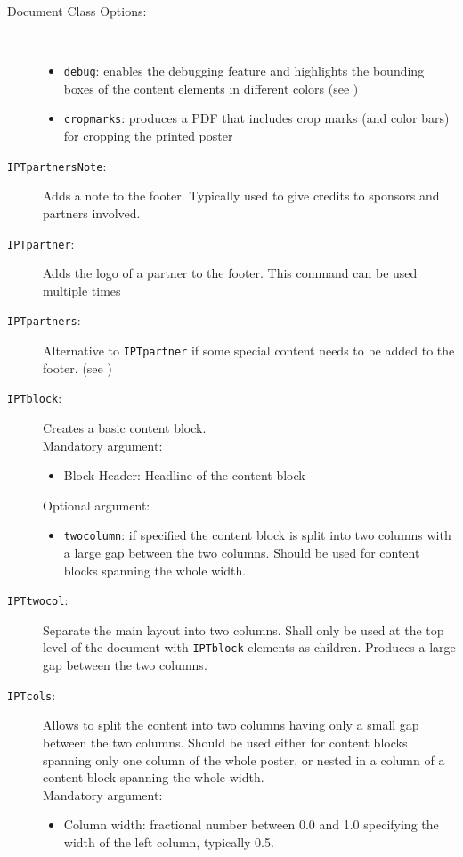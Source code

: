 \begin{description}
	\item[Document Class Options:]~
		\begin{itemize}
			\item \texttt{debug}: enables the debugging feature and highlights the bounding boxes of the content elements in different colors (see )
			\item \texttt{cropmarks}: produces a PDF that includes crop marks (and color bars) for cropping the printed poster
		\end{itemize}
	\item[\texttt{IPTpartnersNote}:]
		Adds a note to the footer. Typically used to give credits to sponsors and partners involved.
	\item[\texttt{IPTpartner}:]
		Adds the logo of a partner to the footer. This command can be used multiple times
	\item[\texttt{IPTpartners}:]
		Alternative to \texttt{\bs{}IPTpartner} if some special content needs to be added to the footer. (see )
	\item[\texttt{IPTblock}:] Creates a basic content block. \\
		Mandatory argument: 
		\begin{itemize}
			\item Block Header: Headline of the content block
		\end{itemize}
		Optional argument:
		\begin{itemize}
			\item \texttt{twocolumn}: if specified the content block is split into two columns with a large gap between the two columns. Should be used for content blocks spanning the whole width.
		\end{itemize}

	\item[\texttt{IPTtwocol}:] Separate the main layout into two columns. Shall only be used at the top level of the document with \texttt{IPTblock} elements as children. Produces a large gap between the two columns.

	\item[\texttt{IPTcols}:] Allows to split the content into two columns having only a small gap between the two columns. Should be used either for content blocks spanning only one column of the whole poster, or nested in a column of a content block spanning the whole width.\\
	Mandatory argument:
		\begin{itemize}
			\item Column width: fractional number between 0.0 and 1.0 specifying the width of the left column, typically 0.5.
		\end{itemize}


\end{description}
